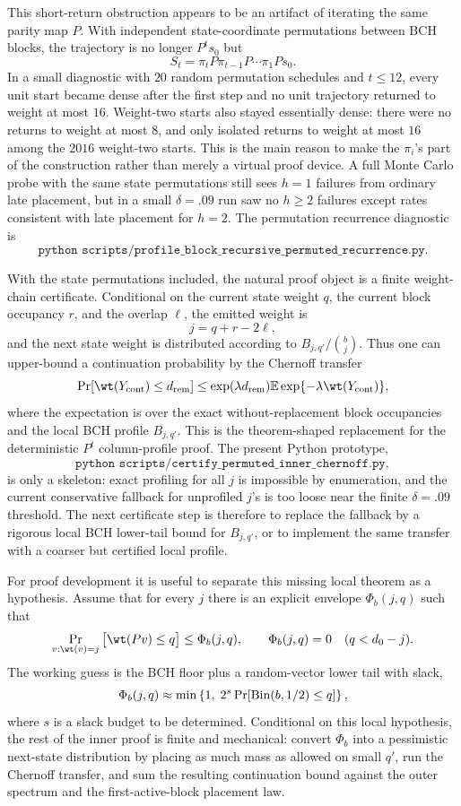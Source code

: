 This short-return obstruction appears to be an artifact of iterating the same parity map \(P\).  With independent
state-coordinate permutations between BCH blocks, the trajectory is no longer \(P^t s_0\) but
\[
S_t=\pi_t P\pi_{t-1}P\cdots \pi_1P s_0.
\]
In a small diagnostic with \(20\) random permutation schedules and \(t\le 12\), every unit start became dense after the
first step and no unit trajectory returned to weight at most \(16\).  Weight-two starts also stayed essentially dense:
there were no returns to weight at most \(8\), and only isolated returns to weight at most \(16\) among the \(2016\)
weight-two starts.  This is the main reason to make the \(\pi_i\)'s part of the construction rather than merely a
virtual proof device.  A full Monte Carlo probe with the same state permutations still sees \(h=1\) failures from
ordinary late placement, but in a small \(\delta=.09\) run saw no \(h\ge 2\) failures except rates consistent with
late placement for \(h=2\).  The permutation recurrence diagnostic is
\[
\texttt{python scripts/profile\_block\_recursive\_permuted\_recurrence.py}.
\]

With the state permutations included, the natural proof object is a finite weight-chain certificate.  Conditional on
the current state weight \(q\), the current block occupancy \(r\), and the overlap \(\ell\), the emitted weight is
\[
j=q+r-2\ell,
\]
and the next state weight is distributed according to \(B_{j,q'}/\binom{b}{j}\).  Thus one can upper-bound a continuation
probability by the Chernoff transfer
\[
\Pr[\wt(Y_{\rm cont})\le d_{\rm rem}]
\le
\exp(\lambda d_{\rm rem})
\mathbb{E}\exp\{-\lambda\wt(Y_{\rm cont})\},
\]
where the expectation is over the exact without-replacement block occupancies and the local BCH profile \(B_{j,q'}\).
This is the theorem-shaped replacement for the deterministic \(P^t\) column-profile proof.  The present Python
prototype,
\[
\texttt{python scripts/certify\_permuted\_inner\_chernoff.py},
\]
is only a skeleton: exact profiling for all \(j\) is impossible by enumeration, and the current conservative fallback
for unprofiled \(j\)'s is too loose near the finite \(\delta=.09\) threshold.  The next certificate step is therefore
to replace the fallback by a rigorous local BCH lower-tail bound for \(B_{j,q'}\), or to implement the same transfer
with a coarser but certified local profile.

For proof development it is useful to separate this missing local theorem as a hypothesis.  Assume that for every
\(j\) there is an explicit envelope \(\Phi_b(j,q)\) such that
\[
\Pr_{v:\wt(v)=j}\big[\wt(Pv)\le q\big]\le \Phi_b(j,q),
\qquad
\Phi_b(j,q)=0\quad(q<d_0-j).
\]
The working guess is the BCH floor plus a random-vector lower tail with slack,
\[
\Phi_b(j,q)\approx
\min\left\{1,\;2^{s}\Pr[{\rm Bin}(b,1/2)\le q]\right\},
\]
where \(s\) is a slack budget to be determined.  Conditional on this local hypothesis, the rest of the inner proof is
finite and mechanical: convert \(\Phi_b\) into a pessimistic next-state distribution by placing as much mass as allowed
on small \(q'\), run the Chernoff transfer, and sum the resulting continuation bound against the outer spectrum and the
first-active-block placement law.

